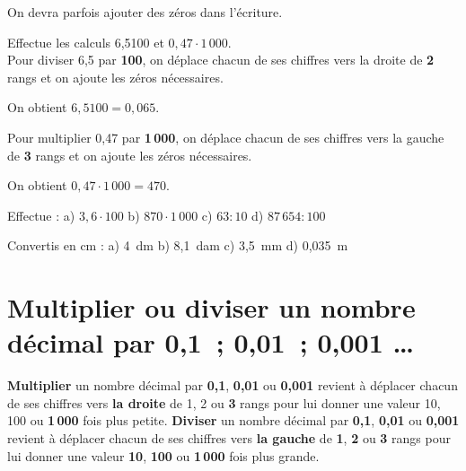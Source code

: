 \begin{remarque}
On devra parfois ajouter des zéros dans l'écriture.
\end{remarque}

\begin{exemple*1}
Effectue les calculs 6,5100 et $0,47 \cdot 1\,000$.\\[1em] %
Pour diviser 6,5 par \textcolor{B1}{\textbf{100}}, on déplace chacun de ses chiffres vers la droite de \textcolor{B1}{\textbf{2}} rangs et on ajoute les zéros nécessaires. 

On obtient $6,5100 = 0,065$.

Pour multiplier 0,47 par \textcolor{J1}{\textbf{1\,000}}, on déplace chacun de ses chiffres vers la gauche de \textcolor{J1}{\textbf{3}} rangs et on ajoute les zéros nécessaires. 

On obtient $0,47 \cdot 1\,000 = 470$. 

\end{exemple*1}


Effectue : a) $3,6 \cdot 100$ \hfill b) $870 \cdot 1\,000$ \hfill  c) $63 : 10$ \hfill d) $87\,654 : 100$
 
Convertis en cm : a) 4 dm \hfill b) 8,1 dam \hfill c) 3,5 mm \hfill d) 0,035 m


\section{Multiplier ou diviser un nombre décimal par 0,1 ; 0,01 ; 0,001 \ldots}

\begin{aconnaitre}
\textbf{Multiplier} un nombre décimal par \textcolor{A1}{\textbf{0,1}}, \textcolor{B1}{\textbf{0,01}} ou \textcolor{J1}{\textbf{0,001}} revient à déplacer chacun de ses chiffres vers \textbf{la droite} de 1, 2 ou \textcolor{J1}{\textbf{3}} rangs pour lui donner une valeur 10, 100 ou \textcolor{J1}{\textbf{1\,000}} fois plus petite.
\textbf{Diviser} un nombre décimal par \textcolor{A1}{\textbf{0,1}}, \textcolor{B1}{\textbf{0,01}} ou \textcolor{J1}{\textbf{0,001}} revient à déplacer chacun de ses chiffres vers \textbf{la gauche} de \textcolor{A1}{\textbf{1}}, \textcolor{B1}{\textbf{2}} ou \textcolor{J1}{\textbf{3}} rangs pour lui donner une valeur \textcolor{A1}{\textbf{10}}, \textcolor{B1}{\textbf{100}} ou \textcolor{J1}{\textbf{1\,000}} fois plus grande.
\end{aconnaitre}

